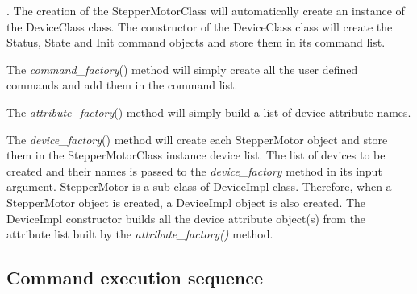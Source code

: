  . The creation of the StepperMotorClass will automatically create
an instance of the DeviceClass class. The constructor of the DeviceClass
class will create the Status, State and
Init command objects and store them in its command list.

The \emph{command\_factory}() method will simply create all the user
defined commands and add them in the command list.

The \emph{attribute\_factory}() method will simply build a list of
device attribute names.

The \emph{device\_factory}() method will create each StepperMotor
object and store them in the StepperMotorClass instance device list.
The list of devices to be created and their names is passed to the
\emph{device\_factory} method in its input argument. StepperMotor
is a sub-class of DeviceImpl class. Therefore, when a StepperMotor
object is created, a DeviceImpl object is also created. The DeviceImpl
constructor builds all the device attribute object(s) from the attribute
list built by the \emph{attribute\_factory()} method.


\subsection{Command execution sequence}

